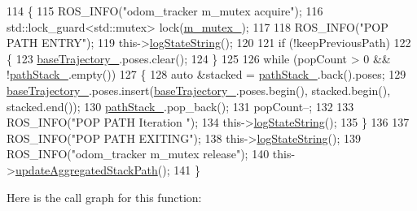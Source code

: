 \begin{DoxyCode}
114         \{
115             ROS\_INFO(\textcolor{stringliteral}{"odom\_tracker m\_mutex acquire"});
116             std::lock\_guard<std::mutex> lock(\hyperlink{classcl__move__base__z_1_1odom__tracker_1_1OdomTracker_aa371639e1eee269273dec8d3ab9dba0f}{m\_mutex\_});
117 
118             ROS\_INFO(\textcolor{stringliteral}{"POP PATH ENTRY"});
119             this->\hyperlink{classcl__move__base__z_1_1odom__tracker_1_1OdomTracker_a6d0b450474d9d555205ff4281965164e}{logStateString}();
120 
121             \textcolor{keywordflow}{if} (!keepPreviousPath)
122             \{
123                 \hyperlink{classcl__move__base__z_1_1odom__tracker_1_1OdomTracker_a466d18a86df049f0f680e043bb5ea91f}{baseTrajectory\_}.poses.clear();
124             \}
125 
126             \textcolor{keywordflow}{while} (popCount > 0 && !\hyperlink{classcl__move__base__z_1_1odom__tracker_1_1OdomTracker_a1ccad1b568b6c65da43ba6639b6bd1ef}{pathStack\_}.empty())
127             \{
128                 \textcolor{keyword}{auto} &stacked = \hyperlink{classcl__move__base__z_1_1odom__tracker_1_1OdomTracker_a1ccad1b568b6c65da43ba6639b6bd1ef}{pathStack\_}.back().poses;
129                 \hyperlink{classcl__move__base__z_1_1odom__tracker_1_1OdomTracker_a466d18a86df049f0f680e043bb5ea91f}{baseTrajectory\_}.poses.insert(\hyperlink{classcl__move__base__z_1_1odom__tracker_1_1OdomTracker_a466d18a86df049f0f680e043bb5ea91f}{baseTrajectory\_}.poses.begin(), 
      stacked.begin(), stacked.end());
130                 \hyperlink{classcl__move__base__z_1_1odom__tracker_1_1OdomTracker_a1ccad1b568b6c65da43ba6639b6bd1ef}{pathStack\_}.pop\_back();
131                 popCount--;
132 
133                 ROS\_INFO(\textcolor{stringliteral}{"POP PATH Iteration "});
134                 this->\hyperlink{classcl__move__base__z_1_1odom__tracker_1_1OdomTracker_a6d0b450474d9d555205ff4281965164e}{logStateString}();
135             \}
136 
137             ROS\_INFO(\textcolor{stringliteral}{"POP PATH EXITING"});
138             this->\hyperlink{classcl__move__base__z_1_1odom__tracker_1_1OdomTracker_a6d0b450474d9d555205ff4281965164e}{logStateString}();
139             ROS\_INFO(\textcolor{stringliteral}{"odom\_tracker m\_mutex release"});
140             this->\hyperlink{classcl__move__base__z_1_1odom__tracker_1_1OdomTracker_a7922f1e1e688a2ed62d32d9914985a9f}{updateAggregatedStackPath}();
141         \}
\end{DoxyCode}
Here is the call graph for this function\+:
\nopagebreak

